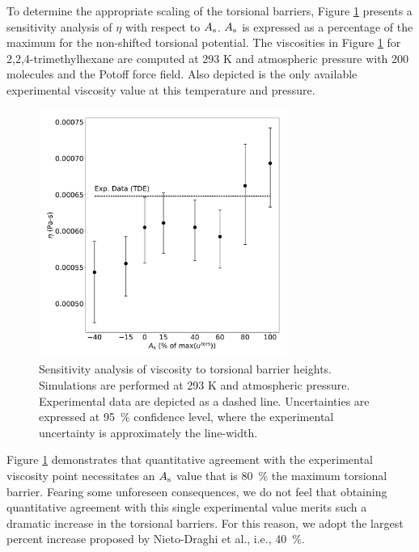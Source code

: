 \documentclass[preprint,review,11pt]{elsarticle}
\begin{document}
	To determine the appropriate scaling of the torsional barriers, Figure \ref{fig:sensitivity_torsions} presents a sensitivity analysis of $\eta$ with respect to $A_{\rm s}$. $A_{\rm s}$ is expressed as a percentage of the maximum for the non-shifted torsional potential. The viscosities in Figure \ref{fig:sensitivity_torsions} for 2,2,4-trimethylhexane are computed at 293 K and atmospheric pressure with 200 molecules and the Potoff force field. Also depicted is the only available experimental viscosity value at this temperature and pressure. 	 
	
	\begin{figure}[htb!]
		\centering
				\includegraphics[width=3.2in]{sensitivity_torsions}
		\caption{Sensitivity analysis of viscosity to torsional barrier heights. Simulations are performed at 293 K and atmospheric pressure. Experimental data are depicted as a dashed line. Uncertainties are expressed at 95~\% confidence level, where the experimental uncertainty is approximately the line-width.}
		\label{fig:sensitivity_torsions}
	\end{figure}
	
	
	Figure \ref{fig:sensitivity_torsions} demonstrates that quantitative agreement with the experimental viscosity point necessitates an $A_{\rm s}$ value that is 80~\% the maximum torsional barrier. Fearing some unforeseen consequences, we do not feel that obtaining quantitative agreement with this single experimental value merits such a dramatic increase in the torsional barriers. For this reason, we adopt the largest percent increase proposed by Nieto-Draghi et al., i.e., 40~\%. 
	
\end{document}
